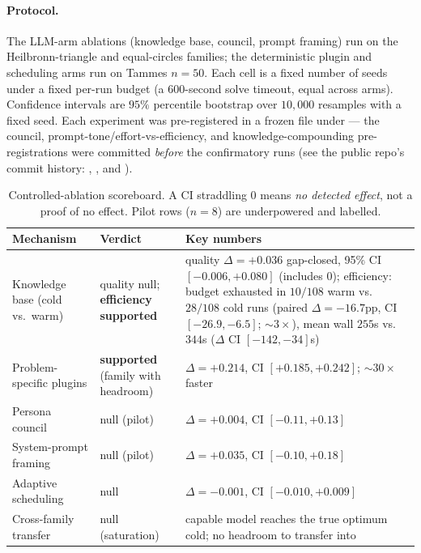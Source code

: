 \documentclass[11pt]{article}
\begin{document}
\paragraph{Protocol.}
The LLM-arm ablations (knowledge base, council, prompt framing) run on the Heilbronn-triangle
and equal-circles families; the deterministic plugin and scheduling arms run on Tammes $n{=}50$.
Each cell is a fixed number of seeds under a fixed per-run budget (a $600$-second solve
timeout, equal across arms). Confidence intervals are $95\%$
percentile bootstrap over $10{,}000$ resamples with a fixed seed. Each experiment was
pre-registered in a frozen file under  ---
the council, prompt-tone/effort-vs-efficiency, and knowledge-compounding
pre-registrations were committed \emph{before} the confirmatory runs (see the public repo's
commit history: ,
, and
).

\begin{table}[htbp]
\centering\small
\setlength{\tabcolsep}{4pt}
\renewcommand{\arraystretch}{1.25}
\caption{Controlled-ablation scoreboard. A CI straddling $0$ means \emph{no detected effect},
  not a proof of no effect. Pilot rows ($n{=}8$) are underpowered and labelled.}
\label{tab:ablations}
\begin{tabularx}{\textwidth}{@{}%
  >{\raggedright\arraybackslash}p{3.0cm}%
  >{\raggedright\arraybackslash}p{3.5cm}%
  >{\raggedright\arraybackslash}X@{}}
\toprule
\textbf{Mechanism} & \textbf{Verdict} & \textbf{Key numbers} \\
\midrule
Knowledge base (cold vs.\ warm) & quality null; \textbf{efficiency supported} & quality $\Delta{=}{+}0.036$ gap-closed, 95\% CI $[{-}0.006,{+}0.080]$ (includes $0$); efficiency: budget exhausted in $10/108$ warm vs.\ $28/108$ cold runs (paired $\Delta{=}{-}16.7$pp, CI $[{-}26.9,{-}6.5]$; ${\sim}3\times$), mean wall $255$s vs.\ $344$s ($\Delta$ CI $[{-}142,{-}34]$s) \\
Problem-specific plugins & \textbf{supported} (family with headroom) & $\Delta{=}{+}0.214$, CI $[{+}0.185,{+}0.242]$; ${\sim}30\times$ faster \\
Persona council & null (pilot) & $\Delta{=}{+}0.004$, CI $[{-}0.11,{+}0.13]$ \\
System-prompt framing & null (pilot) & $\Delta{=}{+}0.035$, CI $[{-}0.10,{+}0.18]$ \\
Adaptive scheduling & null & $\Delta{=}{-}0.001$, CI $[{-}0.010,{+}0.009]$ \\
Cross-family transfer & null (saturation) & capable model reaches the true optimum cold; no headroom to transfer into \\
\bottomrule
\end{tabularx}
\end{table}
\end{document}
